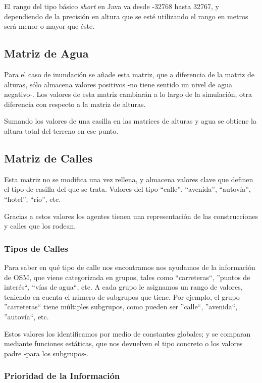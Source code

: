 El rango del tipo básico {\em short} en Java va desde -32768 hasta 32767, y
dependiendo de la precisión en altura que se esté utilizando el rango en metros
será menor o mayor que éste.

\subsection{Matriz de Agua}

Para el caso de inundación se añade esta matriz, que a diferencia de la matriz
de alturas, sólo almacena valores positivos -no tiene sentido un nivel de agua
negativo-. Los valores de esta matriz cambiarán a lo largo de la simulación,
otra diferencia con respecto a la matriz de alturas.

Sumando los valores de una casilla en las matrices de alturas y agua se obtiene
la altura total del terreno en ese punto.

\subsection{Matriz de Calles}

Esta matriz no se modifica una vez rellena, y almacena valores clave que definen
el tipo de casilla del que se trata. Valores del tipo ``calle'', ``avenida'',
``autovía'', ``hotel'', ``río'', etc.

Gracias a estos valores los agentes tienen una representación de las
construcciones y calles que los rodean.

\subsubsection{Tipos de Calles}

Para saber en qué tipo de calle nos encontramos nos ayudamos de la información
de OSM, que viene categorizada en grupos, tales como ``carreteras``, ''puntos
de interés``, ``vías de agua``, etc. A cada grupo le asignamos un rango de
valores, teniendo en cuenta el número de subgrupos que tiene. Por ejemplo, el
grupo ''carreteras`` tiene múltiples subgrupos, como pueden ser ''calle``,
''avenida``, ''autovía``, etc.

Estos valores los identificamos por medio de constantes globales; y se
comparan mediante funciones estáticas, que nos devuelven el tipo concreto o los
valores padre -para los subgrupos-.

\subsubsection{Prioridad de la Información}

